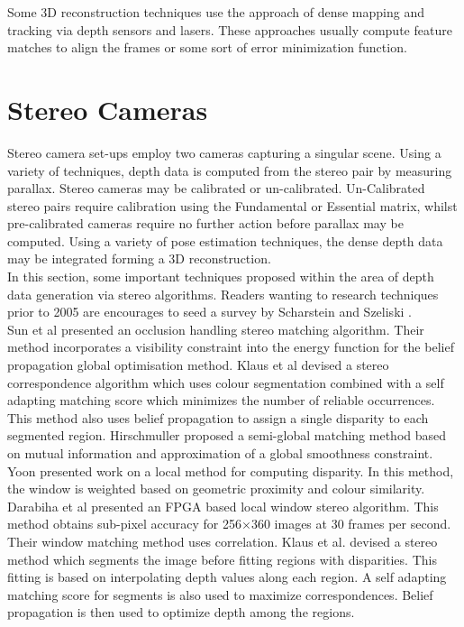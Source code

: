 Some 3D reconstruction techniques use the approach of dense mapping and tracking via depth sensors and lasers. These approaches usually compute feature matches to align the frames or some sort of error minimization function.


\section{Stereo Cameras}

\label{StereoMethodsSection}

Stereo camera set-ups employ two cameras capturing a singular scene. Using a variety of techniques, depth data is computed from the stereo pair by measuring parallax. Stereo cameras may be calibrated or un-calibrated. Un-Calibrated stereo pairs require calibration using the Fundamental or Essential matrix, whilst pre-calibrated cameras require no further action before parallax may be computed. Using a variety of pose estimation techniques, the dense depth data may be integrated forming a 3D reconstruction. \\

In this section, some important techniques proposed within the area of depth data generation via stereo algorithms. Readers wanting to research techniques prior to 2005 are encourages to seed a survey by Scharstein and Szeliski \cite{Scharstein02Taxonomy}. \\


Sun et al \cite{Sun05Symmetric} presented an occlusion handling stereo matching algorithm. Their method incorporates a visibility constraint into the energy function for the belief propagation global optimisation method. Klaus et al \cite{Klaus06Segment} devised a stereo correspondence algorithm which uses colour segmentation combined with a self adapting matching score which minimizes the number of reliable occurrences. This method also uses belief propagation to assign a single disparity to each segmented region. Hirschmuller \cite{Hirschmuller05Accurate} proposed a semi-global matching method based on mutual information and approximation of a global smoothness constraint. \\

Yoon \cite{Yoon06Adaptive} presented work on a local method for computing disparity. In this method, the window is weighted based on geometric proximity and colour similarity. Darabiha et al \cite{Darabiha06Reconfigurable} presented an FPGA based local window stereo algorithm. This method obtains sub-pixel accuracy for 256$\times$360 images at 30 frames per second. Their window matching method uses correlation. Klaus et al. \cite{Klaus06Segment} devised a stereo method which segments the image before fitting regions with disparities. This fitting is based on interpolating depth values along each region. A self adapting matching score for segments is also used to maximize correspondences. Belief propagation is then used to optimize depth among the regions. \\


